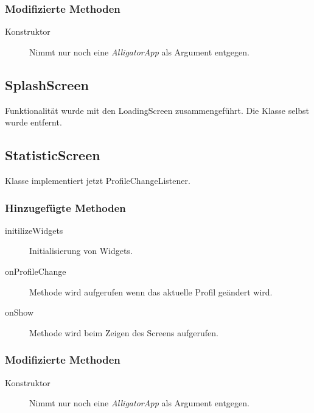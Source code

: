 \subsubsection{Modifizierte Methoden}
\begin{description}
\item[Konstruktor]
Nimmt nur noch eine \emph{AlligatorApp} als Argument entgegen.

\end{description}

\subsection{SplashScreen}
Funktionalität wurde mit den LoadingScreen zusammengeführt. Die Klasse selbst wurde entfernt.



\subsection{StatisticScreen}
Klasse implementiert jetzt ProfileChangeListener.
\subsubsection{Hinzugefügte Methoden}
\begin{description}
\item[initilizeWidgets]
Initialisierung von Widgets.
\item[onProfileChange]
Methode wird aufgerufen wenn das aktuelle Profil geändert wird.

\item[onShow]
Methode wird beim Zeigen des Screens aufgerufen.



\end{description}

\subsubsection{Modifizierte Methoden}
\begin{description}
\item[Konstruktor]
Nimmt nur noch eine \emph{AlligatorApp} als Argument entgegen.

\end{description}

